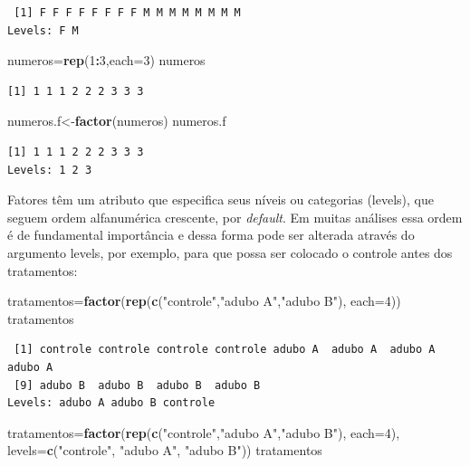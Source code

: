 \documentclass[12pt,brazil,oneside]{book}
\newenvironment{Shaded}{\begin{snugshade}}{\end{snugshade}}
\newcommand{\DataTypeTok}[1]{\textcolor[rgb]{0.13,0.29,0.53}{#1}}
\newcommand{\DecValTok}[1]{\textcolor[rgb]{0.00,0.00,0.81}{#1}}
\newcommand{\KeywordTok}[1]{\textcolor[rgb]{0.13,0.29,0.53}{\textbf{#1}}}
\newcommand{\NormalTok}[1]{#1}
\newcommand{\OperatorTok}[1]{\textcolor[rgb]{0.81,0.36,0.00}{\textbf{#1}}}
\newcommand{\StringTok}[1]{\textcolor[rgb]{0.31,0.60,0.02}{#1}}
\begin{document}
\begin{verbatim}
 [1] F F F F F F F F M M M M M M M M
Levels: F M
\end{verbatim}

\begin{Shaded}
\begin{Highlighting}[]
\NormalTok{numeros=}\KeywordTok{rep}\NormalTok{(}\DecValTok{1}\OperatorTok{:}\DecValTok{3}\NormalTok{,}\DataTypeTok{each=}\DecValTok{3}\NormalTok{)}
\NormalTok{numeros}
\end{Highlighting}
\end{Shaded}

\begin{verbatim}
[1] 1 1 1 2 2 2 3 3 3
\end{verbatim}

\begin{Shaded}
\begin{Highlighting}[]
\NormalTok{numeros.f<-}\KeywordTok{factor}\NormalTok{(numeros)}
\NormalTok{numeros.f}
\end{Highlighting}
\end{Shaded}

\begin{verbatim}
[1] 1 1 1 2 2 2 3 3 3
Levels: 1 2 3
\end{verbatim}

Fatores têm um atributo que especifica seus níveis ou categorias (levels), que seguem ordem alfanumérica crescente, por \emph{default}. Em muitas análises essa ordem é de fundamental importância e dessa forma pode ser alterada através do argumento levels, por exemplo, para que possa ser colocado o controle antes dos tratamentos:

\begin{Shaded}
\begin{Highlighting}[]
\NormalTok{tratamentos=}\KeywordTok{factor}\NormalTok{(}\KeywordTok{rep}\NormalTok{(}\KeywordTok{c}\NormalTok{(}\StringTok{"controle"}\NormalTok{,}\StringTok{"adubo A"}\NormalTok{,}\StringTok{"adubo B"}\NormalTok{), }\DataTypeTok{each=}\DecValTok{4}\NormalTok{))}
\NormalTok{tratamentos}
\end{Highlighting}
\end{Shaded}

\begin{verbatim}
 [1] controle controle controle controle adubo A  adubo A  adubo A  adubo A 
 [9] adubo B  adubo B  adubo B  adubo B 
Levels: adubo A adubo B controle
\end{verbatim}

\begin{Shaded}
\begin{Highlighting}[]
\NormalTok{tratamentos=}\KeywordTok{factor}\NormalTok{(}\KeywordTok{rep}\NormalTok{(}\KeywordTok{c}\NormalTok{(}\StringTok{"controle"}\NormalTok{,}\StringTok{"adubo A"}\NormalTok{,}\StringTok{"adubo B"}\NormalTok{), }\DataTypeTok{each=}\DecValTok{4}\NormalTok{), }
\DataTypeTok{levels=}\KeywordTok{c}\NormalTok{(}\StringTok{"controle"}\NormalTok{, }\StringTok{"adubo A"}\NormalTok{, }\StringTok{"adubo B"}\NormalTok{))}
\NormalTok{tratamentos}
\end{Highlighting}
\end{Shaded}
\end{document}
